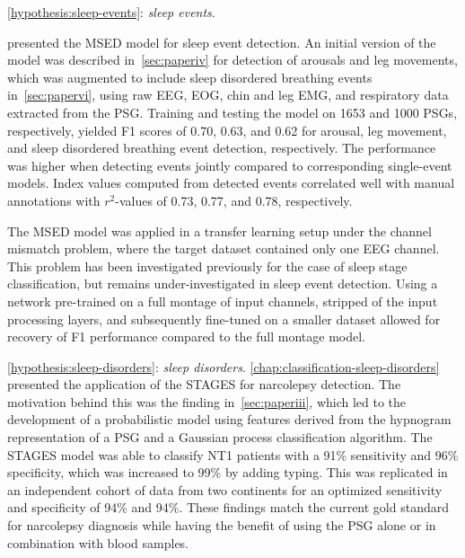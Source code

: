 \bigskip
\noindent \ref{hypothesis:sleep-events}: \textit{\hypothesis\xspace sleep events}.

 presented the \ac{MSED} model for sleep event detection.
An initial version of the model was described in~\cref{sec:paperiv} for detection of arousals and leg movements, which was augmented to include sleep disordered breathing events in~\cref{sec:papervi}, using raw \ac{EEG}, \ac{EOG}, chin and leg \ac{EMG}, and respiratory data extracted from the \ac{PSG}.
Training and testing the model on 1653 and 1000 \acp{PSG}, respectively, yielded F1 scores of 0.70, 0.63, and 0.62 for arousal, leg movement, and sleep disordered breathing event detection, respectively.
The performance was higher when detecting events jointly compared to corresponding single-event models.
Index values computed from detected events correlated well with manual annotations with \(r^2\)-values of 0.73, 0.77, and 0.78, respectively.

The \ac{MSED} model was applied in a transfer learning setup under the channel mismatch problem, where the target dataset contained only one \ac{EEG} channel.
This problem has been investigated previously for the case of sleep stage classification, but remains under-investigated in sleep event detection.
Using a network pre-trained on a full montage of input channels, stripped of the input processing layers, and subsequently fine-tuned on a smaller dataset allowed for recovery of F1 performance compared to the full montage model.



\bigskip
\noindent \ref{hypothesis:sleep-disorders}: \textit{\hypothesis\xspace sleep disorders}.
\cref{chap:classification-sleep-disorders} presented the application of the \ac{STAGES} for narcolepsy detection.
The motivation behind this was the finding in~\cref{sec:paperiii}, which led to the development of a probabilistic model using features derived from the hypnogram representation of a \ac{PSG} and a Gaussian process classification algorithm. 
The \ac{STAGES} model was able to classify \ac{NT1} patients with a 91\% sensitivity and 96\% specificity, which was increased to 99\% by adding \hla typing. 
This was replicated in an independent cohort of data from two continents for an optimized sensitivity and specificity of 94\% and 94\%.
These findings match the current gold standard for narcolepsy diagnosis while having the benefit of using the \ac{PSG} alone or in combination with blood samples.

